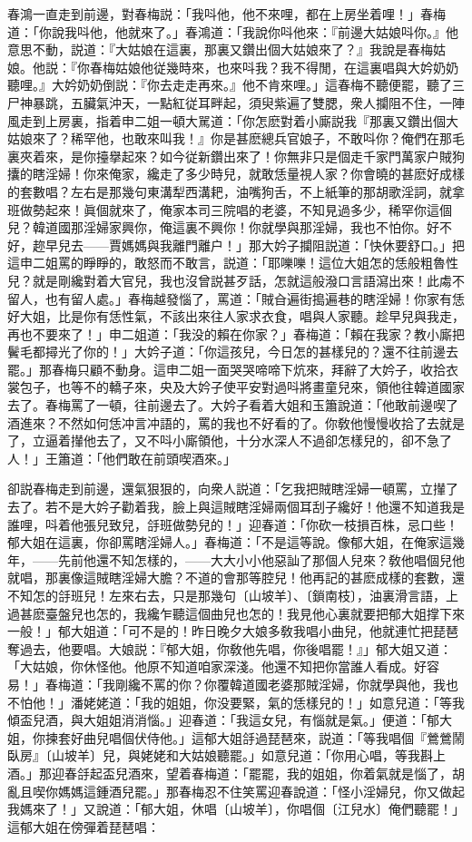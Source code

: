 春鴻一直走到前邊，對春梅説：「我呌他，他不來哩，都在上房坐着哩！」春梅道：「你說我呌他，他就來了。」春鴻道：「我說你呌他來：『前邊大姑娘呌你。』他意思不動，説道：『大姑娘在這裏，那裏又鑽出個大姑娘來了？』我說是春梅姑娘。他説：『你春梅姑娘他従幾時來，也來呌我？我不得閒，在這裏唱與大妗奶奶聽哩。』大妗奶奶倒説：『你去走走再來。』他不肯來哩。」這春梅不聽便罷，聽了三尸神暴跳，五臟氣沖天，一點紅従耳畔起，須臾紫遍了雙腮，衆人攔阻不住，一陣風走到上房裏，指着申二姐一頓大駡道：「你怎麽對着小廝説我『那裏又鑽出個大姑娘來了？稀罕他，也敢來叫我！』你是甚麽總兵官娘子，不敢呌你？俺們在那毛裏夾着來，是你擡擧起來？如今従新鑽出來了！你無非只是個走千家門萬家户賊狗攮的瞎淫婦！你來俺家，纔走了多少時兒，就敢恁量視人家？你會曉的甚麽好成樣的套數唱？左右是那幾句東溝犁西溝耙，油嘴狗舌，不上紙筆的那胡歌淫詞，就拿班做勢起來！眞個就來了，俺家本司三院唱的老婆，不知見過多少，稀罕你這個兒？韓道國那淫婦家興你，俺這裏不興你！你就學與那淫婦，我也不怕你。好不好，趂早兒去——賈媽媽與我離門離户！」那大妗子攔阻説道：「快休要舒口。」把這申二姐罵的睜睜的，敢怒而不敢言，説道：「耶嚛嚛！這位大姐怎的恁般粗魯性兒？就是剛纔對着大官兒，我也沒曾説甚歹話，怎就這般潑口言語瀉出來！此䖏不留人，也有留人處。」春梅越發惱了，罵道：「賊㒲遍街搗遍巷的瞎淫婦！你家有恁好大姐，比是你有恁性氣，不該出來往人家求衣食，唱與人家聽。趁早兒與我走，再也不要來了！」申二姐道：「我没的賴在你家？」春梅道：「賴在我家？教小廝把鬢毛都撏光了你的！」大妗子道：「你這孩兒，今日怎的甚樣兒的？還不往前邊去罷。」那春梅只顧不動身。這申二姐一面哭哭啼啼下炕來，拜辭了大妗子，收拾衣裳包子，也等不的轎子來，央及大妗子使平安對過呌將畫童兒來，領他往韓道國家去了。春梅罵了一頓，往前邊去了。大妗子看着大姐和玉簫說道：「他敢前邊喫了酒進來？不然如何恁冲言冲語的，罵的我也不好看的了。你敎他慢慢收拾了去就是了，立逼着攆他去了，又不呌小廝領他，十分水深人不過卻怎樣兒的，卻不急了人！」王簫道：「他們敢在前頭喫酒來。」

卻説春梅走到前邊，還氣狠狠的，向衆人説道：「乞我把賊瞎淫婦一頓罵，立攆了去了。若不是大妗子勸着我，臉上與這賊瞎淫婦兩個耳刮子纔好！他還不知道我是誰哩，呌着他張兒致兒，㧱班做勢兒的！」迎春道：「你砍一枝損百株，忌口些！郁大姐在這裏，你卻罵瞎淫婦人。」春梅道：「不是這等說。像郁大姐，在俺家這幾年，——先前他還不知怎樣的，——大大小小他惡訕了那個人兒來？敎他唱個兒他就唱，那裏像這賊瞎淫婦大膽？不道的會那等腔兒！他再記的甚麽成樣的套數，還不知怎的㧱班兒！左來右去，只是那幾句〔山坡羊〕、〔鎖南枝〕，油裏滑言語，上過甚麽臺盤兒也怎的，我纔乍聽這個曲兒也怎的！我見他心裏就要把郁大姐撑下來一般！」郁大姐道：「可不是的！昨日晚夕大娘多敎我唱小曲兒，他就連忙把琵琶奪過去，他要唱。大娘説：『郁大姐，你敎他先唱，你後唱罷！』」郁大姐又道：「大姑娘，你休怪他。他原不知道咱家深淺。他還不知把你當誰人看成。好容易！」春梅道：「我剛纔不罵的你？你覆韓道國老婆那賊淫婦，你就學與他，我也不怕他！」潘姥姥道：「我的姐姐，你没要緊，氣的恁樣兒的！」如意兒道：「等我傾盃兒酒，與大姐姐消消惱。」迎春道：「我這女兒，有惱就是氣。」便道：「郁大姐，你揀套好曲兒唱個伏侍他。」這郁大姐㧱過琵琶來，説道：「等我唱個『鶯鶯鬧臥房』〔山坡羊〕兒，與姥姥和大姑娘聽罷。」如意兒道：「你用心唱，等我斟上酒。」那迎春㧱起盃兒酒來，望着春梅道：「罷罷，我的姐姐，你着氣就是惱了，胡亂且喫你媽媽這鍾酒兒罷。」那春梅忍不住笑罵迎春說道：「怪小淫婦兒，你又做起我媽來了！」又說道：「郁大姐，休唱〔山坡羊〕，你唱個〔江兒水〕俺們聽罷！」這郁大姐在傍彈着琵琶唱：

